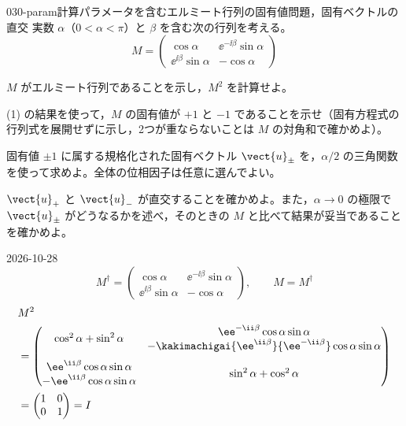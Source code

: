 \documentclass[uplatex,dvipdfmx,a4paper,11pt]{jsarticle}
\begin{document}
\begin{mondai}{030-param}{計算}{パラメータを含むエルミート行列の固有値問題，固有ベクトルの直交}
実数 $\alpha$（$0<\alpha<\pi$）と $\beta$ を含む次の行列を考える。
  \[ M=\begin{pmatrix}\cos\alpha & \ee^{-\ii\beta}\sin\alpha\\ \ee^{\ii\beta}\sin\alpha & -\cos\alpha\end{pmatrix} \]
  \begin{shoumon}
    \item $M$ がエルミート行列であることを示し，$M^{2}$ を計算せよ。
    \item (1) の結果を使って，$M$ の固有値が $+1$ と $-1$ であることを示せ（固有方程式の行列式を展開せずに示し，2つが重ならないことは $M$ の対角和で確かめよ）。
    \item 固有値 $\pm1$ に属する規格化された固有ベクトル $\vect{u}_{\pm}$ を，$\alpha/2$ の三角関数を使って求めよ。全体の位相因子は任意に選んでよい。
    \item $\vect{u}_{+}$ と $\vect{u}_{-}$ が直交することを確かめよ。また，$\alpha\to 0$ の極限で $\vect{u}_{\pm}$ がどうなるかを述べ，そのときの $M$ と比べて結果が妥当であることを確かめよ。
  \end{shoumon}
\begin{kotaeutsushi}{2026-10-28}
\[ M^{\dagger}=\begin{pmatrix}\cos\alpha & \ee^{-\ii\beta}\sin\alpha\\ \ee^{\ii\beta}\sin\alpha & -\cos\alpha\end{pmatrix},\qquad M=M^{\dagger} \]
\begin{align*}
&M^{2}\\
&=\begin{pmatrix}\cos^{2}\alpha+\sin^{2}\alpha & \begin{matrix}\ee^{-\ii\beta}\cos\alpha\sin\alpha\\ -\kakimachigai{\ee^{\ii\beta}}{\ee^{-\ii\beta}}\cos\alpha\sin\alpha\end{matrix}\\[3ex] \begin{matrix}\ee^{\ii\beta}\cos\alpha\sin\alpha\\ -\ee^{\ii\beta}\cos\alpha\sin\alpha\end{matrix} & \sin^{2}\alpha+\cos^{2}\alpha\end{pmatrix}\\
&=\begin{pmatrix}1&0\\0&1\end{pmatrix}=I

\end{align*}
\end{kotaeutsushi}
\end{mondai}
\end{document}
